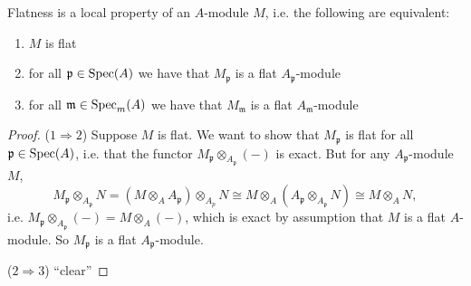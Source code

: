 \documentclass[12pt]{article}
\begin{document}
\begin{proposition}
	Flatness is a local property of an $A$-module $M$, i.e. the following are equivalent:
	\begin{enumerate}
		\item $M$ is flat 
		\item for all $\mathfrak{p}\in\text{Spec}(A)$ we have that $M_\mathfrak{p}$ is a flat $A_\mathfrak{p}$-module 
		\item for all $\mathfrak{m}\in\text{Spec}_m(A)$ we have that $M_\mathfrak{m}$ is a flat $A_\mathfrak{m}$-module
	\end{enumerate}
\end{proposition}
\begin{proof}
	($1\Rightarrow 2$) Suppose $M$ is flat. We want to show that $M_\mathfrak{p}$ is flat for all $\mathfrak{p}\in\text{Spec}(A)$, i.e. that the functor $M_\mathfrak{p}\otimes_{A_\mathfrak{p}}(-)$ is exact. But for any $A_\mathfrak{p}$-module $M$,
	\begin{equation*}
		M_\mathfrak{p} \otimes_{A_\mathfrak{p}} N 
		= (M \otimes_A A_\mathfrak{p})\otimes_{A_p}N 
		\cong M\otimes_A (A_\mathfrak{p}\otimes_{A_\mathfrak{p}}N)
		\cong M\otimes_A N,
	\end{equation*}
	i.e. $M_\mathfrak{p}\otimes_{A_\mathfrak{p}}(-)=M\otimes_A(-)$, which is exact by assumption that $M$ is a flat $A$-module. So $M_\mathfrak{p}$ is a flat $A_\mathfrak{p}$-module.

	($2\Rightarrow 3$) ``clear''


\end{proof}
\end{document}
